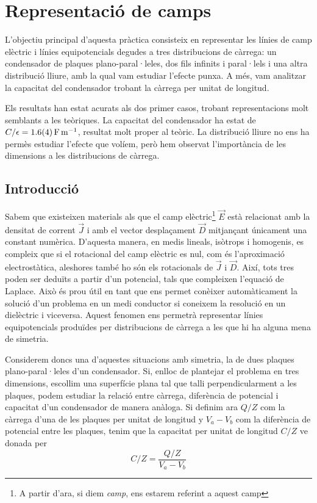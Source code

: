 \chapter{Representació de camps}
\begin{resum}
	L'objectiu principal d'aquesta pràctica consisteix en representar les línies de camp elèctric i línies equipotencials degudes a tres distribucions de càrrega: un condensador de plaques plano-paral·leles, dos fils infinits i paral·lels i una altra distribució lliure, amb la qual vam estudiar l'efecte punxa. A més, vam analitzar la capacitat del condensador trobant la càrrega per unitat de longitud.

	Els resultats han estat acurats als dos primer casos, trobant representacions molt semblants a les teòriques. La capacitat del condensador ha estat de $C/\epsilon = \data{1.6}{0.4}{F.m^{-1}} $, resultat molt proper al teòric. La distribució lliure no ens ha permès estudiar l'efecte que volíem, però hem observat l'importància de les dimensions a les distribucions de càrrega.
\end{resum}

\section{Introducció}
Sabem que existeixen materials als que el camp elèctric\footnote{A partir d'ara, si diem \textit{camp}, ens estarem referint a aquest camp} $\vec{E}$ està relacionat amb la densitat de corrent $\vec{J}$ i amb el vector desplaçament $\vec{D}$ mitjançant únicament una constant numèrica. D'aquesta manera, en medis lineals, isòtrops i homogenis, es compleix que si el rotacional del camp elèctric es nul, com és l'aproximació electrostàtica, aleshores també ho són els rotacionals de $\vec{J}$ i $\vec{D}$. Així, tots tres poden ser deduïts a partir d'un potencial, tals que compleixen l'equació de Laplace. Això és prou útil en tant que ens permet conèixer automàticament la solució d'un problema en un medi conductor si coneixem la resolució en un dielèctric i viceversa. Aquest fenomen ens permetrà representar línies equipotencials produïdes per distribucions de càrrega a les que hi ha alguna mena de simetria.

Considerem doncs una d'aquestes situacions amb simetria, la de dues plaques plano-paral·leles d'un condensador. Si, enlloc de plantejar el problema en tres dimensions, escollim una superfície plana tal que talli perpendicularment a les plaques, podem estudiar la relació entre càrrega, diferència de potencial i capacitat d'un condensador de manera anàloga. Si definim ara $Q/Z$ com la càrrega d'una de les plaques per unitat de longitud y $V_a-V_b$ com la diferència de potencial entre les plaques, tenim que la capacitat per unitat de longitud $C/Z$ ve donada per
\begin{equation} \label{eq:capacitat}
	C/Z=\frac{Q/Z}{V_a-V_b}
\end{equation}

